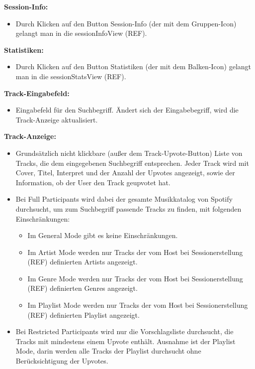 \documentclass[oneside, ngerman]{sdqtechreport}
\begin{document}
\textbf{Session-Info:}
\begin{itemize}
    \item Durch Klicken auf den Button Session-Info (der mit dem Gruppen-Icon) gelangt man in die sessionInfoView (REF).
\end{itemize}

\textbf{Statistiken:}
\begin{itemize}
    \item Durch Klicken auf den Button Statistiken (der mit dem Balken-Icon) gelangt man in die sessionStatsView (REF).
\end{itemize}

\textbf{Track-Eingabefeld:}
\begin{itemize}
    \item Eingabefeld für den Suchbegriff. Ändert sich der Eingabebegriff, wird die Track-Anzeige aktualisiert.
\end{itemize}

\textbf{Track-Anzeige:}
\begin{itemize}
    \item Grundsätzlich nicht klickbare (außer dem Track-Upvote-Button) Liste von Tracks, die dem eingegebenen Suchbegriff entsprechen. Jeder Track wird mit Cover, Titel, Interpret und der Anzahl der Upvotes angezeigt, sowie der Information, ob der User den Track geupvotet hat.
    \item Bei Full Participants wird dabei der gesamte Musikkatalog von Spotify durchsucht, um zum Suchbegriff passende Tracks zu finden, mit folgenden Einschränkungen:
    \begin{itemize}
        \item Im General Mode gibt es keine Einschränkungen.
        \item Im Artist Mode werden nur Tracks der vom Host bei Sessionerstellung (REF) definierten Artists angezeigt.
        \item Im Genre Mode werden nur Tracks der vom Host bei Sessionerstellung (REF) definierten Genres angezeigt.
        \item Im Playlist Mode werden nur Tracks der vom Host bei Sessionerstellung (REF) definierten Playlist angezeigt.
    \end{itemize}
    \item Bei Restricted Participants wird nur die Vorschlagsliste durchsucht, die Tracks mit mindestens einem Upvote enthält. Ausnahme ist der Playlist Mode, darin werden alle Tracks der Playlist durchsucht ohne Berücksichtigung der Upvotes.
\end{itemize}
\end{document}
